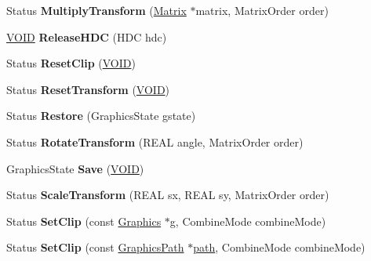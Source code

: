 \begin{DoxyCompactItemize}
Status {\bfseries Multiply\+Transform} (\hyperlink{class_matrix}{Matrix} $\ast$matrix, Matrix\+Order order)
\item 
\mbox{\label{class_graphics_a8d17b56b48300ca00016e8461af3327c}} 
\hyperlink{interfacevoid}{V\+O\+ID} {\bfseries Release\+H\+DC} (H\+DC hdc)
\item 
\mbox{\label{class_graphics_a4ec150c2646d1e213186ea5d78229fe4}} 
Status {\bfseries Reset\+Clip} (\hyperlink{interfacevoid}{V\+O\+ID})
\item 
\mbox{\label{class_graphics_a228c535e57ee64ea2f5b7ef5e577c959}} 
Status {\bfseries Reset\+Transform} (\hyperlink{interfacevoid}{V\+O\+ID})
\item 
\mbox{\label{class_graphics_a240b83042801e8c130e78ca3b76d149a}} 
Status {\bfseries Restore} (Graphics\+State gstate)
\item 
\mbox{\label{class_graphics_a65fbaf8f3e6ff7a75df424b8366a6de6}} 
Status {\bfseries Rotate\+Transform} (R\+E\+AL angle, Matrix\+Order order)
\item 
\mbox{\label{class_graphics_a136c0a9e4a26de8ea5a026c096eb51c1}} 
Graphics\+State {\bfseries Save} (\hyperlink{interfacevoid}{V\+O\+ID})
\item 
\mbox{\label{class_graphics_ac2f0f29cf63e93222a0702fadca69efc}} 
Status {\bfseries Scale\+Transform} (R\+E\+AL sx, R\+E\+AL sy, Matrix\+Order order)
\item 
\mbox{\label{class_graphics_a1ee88ff0be97daa3d1e278125fd84f87}} 
Status {\bfseries Set\+Clip} (const \hyperlink{class_graphics}{Graphics} $\ast$g, Combine\+Mode combine\+Mode)
\item 
\mbox{\label{class_graphics_a7cc16190cbfc44053b2166e40f2ec936}} 
Status {\bfseries Set\+Clip} (const \hyperlink{class_graphics_path}{Graphics\+Path} $\ast$\hyperlink{structpath}{path}, Combine\+Mode combine\+Mode)
\item 
\mbox{\label{class_graphics_aff502e465ddd2da4e2017ab356734725}} 

\end{DoxyCompactItemize}
